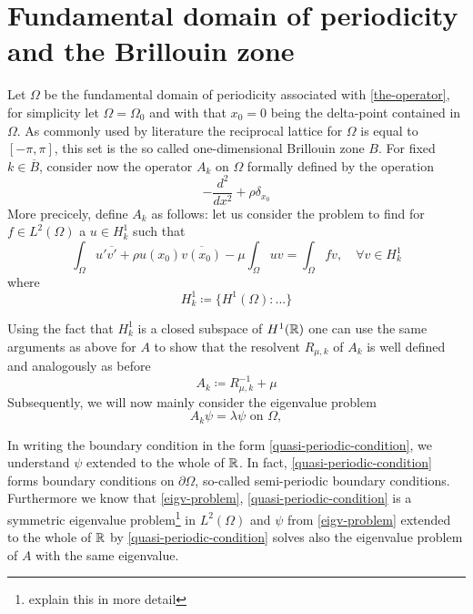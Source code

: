 \chapter{Fundamental domain of periodicity and the Brillouin zone}

Let $\Omega$ be the fundamental domain of periodicity associated with \eqref{the-operator}, for simplicity let $\Omega = \Omega_{0}$ and with that $x_{0} = 0$ being the delta-point contained in $\Omega$. As commonly used by literature the reciprocal lattice for $\Omega$ is equal to $[-\pi, \pi]$, this set is the so called one-dimensional Brillouin zone $B$. For fixed $k \in \overline{B}$, consider now the operator $A_{k}$ on $\Omega$ formally defined by the operation
		\[ -\frac{d^{2}}{dx^{2}} + \rho \delta_{x_{0}} \]
	More precicely, define $A_{k}$ as follows: let us consider the problem to find for $f \in L^{2}(\Omega)$ a $u \in H^{1}_{k}$ such that
	\[ \int_{\Omega} u' \overline{v'} + \rho u(x_{0}) \overline{v(x_{0})} - \mu \int_{\Omega} u v = \int_{\Omega} f v, \quad \forall v \in H^{1}_{k} \]
	where 
	\begin{equation}
		H^{1}_{k} \coloneqq \big\{ H^{1}(\Omega): ... \big\} \label{quasi-periodic-condition}	
	\end{equation}

 	Using the fact that $H^{1}_{k}$ is a closed subspace of $H^{1}(\mathbb{R})$ one can use the same arguments as above for $A$ to show that the resolvent $R_{\mu, k}$ of $A_{k}$ is well defined and analogously as before
		\[ A_{k} \coloneqq R_{\mu, k}^{-1} + \mu \]
	Subsequently, we will now mainly consider the eigenvalue problem
	\begin{equation}
		A_{k} \psi = \lambda \psi \text{ on } \Omega, \label{eigv-problem}
	\end{equation}

	In writing the boundary condition in the form \eqref{quasi-periodic-condition}, we understand $\psi$ extended to the whole of $\mathbb{R}$. In fact, \eqref{quasi-periodic-condition} forms boundary conditions on $\partial \Omega$, so-called semi-periodic boundary conditions. Furthermore we know that \eqref{eigv-problem}, \eqref{quasi-periodic-condition} is a symmetric eigenvalue problem\footnote{explain this in more detail} in $L^{2}(\Omega)$ and $\psi$ from \ref{eigv-problem} extended to the whole of $\mathbb{R}$ by \eqref{quasi-periodic-condition} solves also the eigenvalue problem of $A$ with the same eigenvalue. \\
	

